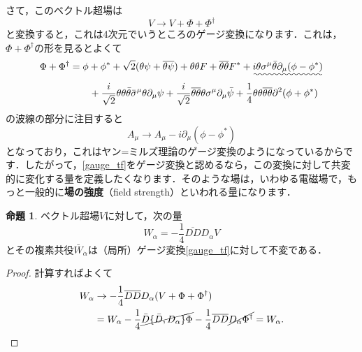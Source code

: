 \documentclass[a4paper,uplatex,dvipdfmx]{jsarticle}
\theoremstyle{definition}
\newtheorem{prop}{命題}
\begin{document}
さて，このベクトル超場は
\begin{equation}
  V
  \rightarrow
  V
  +
  \Phi
  +
  \Phi^{\dag}
  \label{gauge_tf}
\end{equation}
と変換すると，これは4次元でいうところのゲージ変換になります．これは，$\Phi+\Phi^{\dag}$の形を見るとよくて
\begin{align}
  \Phi
  +
  \Phi^{\dag}
  &=
  \phi+\phi^{*}
  +
  \sqrt{2}
  (\theta\psi+\overline{\theta\psi})
  +
  \theta\theta F
  +
  \overline{\theta\theta} F^{*}
  +
  \uwave{
    i\theta\sigma^{\mu}\bar{\theta}\partial_{\mu}(\phi-\phi^{*})
  }
  \nonumber
  \\
  &\qquad
  +
  \frac{i}{\sqrt{2}}\theta\theta\bar{\theta}\bar{\sigma}^{\mu}\theta\partial_{\mu}\psi
  +
  \frac{i}{\sqrt{2}}\overline{\theta\theta}\theta\sigma^{\mu}\partial_{\mu}\bar{\psi}
  +
  \frac{1}{4}\theta\theta\overline{\theta\theta}\partial^2(\phi+\phi^{*})
\end{align}
の波線\uwave{\qquad}の部分に注目すると
\begin{equation}
  A_{\mu}
  \rightarrow
  A_{\mu}
  -
  i\partial_{\mu}(\phi-\phi^{*})
\end{equation}
となっており，これはヤン=ミルズ理論のゲージ変換のようになっているからです．したがって，\eqref{gauge_tf}をゲージ変換と認めるなら，この変換に対して共変的に変化する量を定義したくなります．そのような場は，いわゆる電磁場で，もっと一般的に\textbf{場の強度}（field strength）といわれる量になります．

\begin{prop}
  ベクトル超場$V$に対して，次の量
  \begin{equation}
    W_{\alpha}
    =
    -
    \frac{1}{4}\overline{DD}D_{\alpha}V
  \end{equation}
  とその複素共役$\bar{W}_{\dot{\alpha}}$は（局所）ゲージ変換\eqref{gauge_tf}に対して不変である．
\end{prop}

\begin{proof}
  計算すればよくて
  \begin{align}
    W_{\alpha}
    &
    \rightarrow
    -
    \frac{1}{4}
    \overline{DD}D_{\alpha}(V+\Phi+\Phi^{\dag})
    \nonumber
    \\
    &=
    W_{\alpha}
    -
    \frac{1}{4}\cancel{\bar{D}\{\bar{D},D_{\alpha}\}\Phi}
    -
    \frac{1}{4}\overline{DD}\cancel{D_{\alpha}\Phi^{\dag}}
    =
    W_{\alpha}
    .
  \end{align}
\end{proof}
\end{document}
